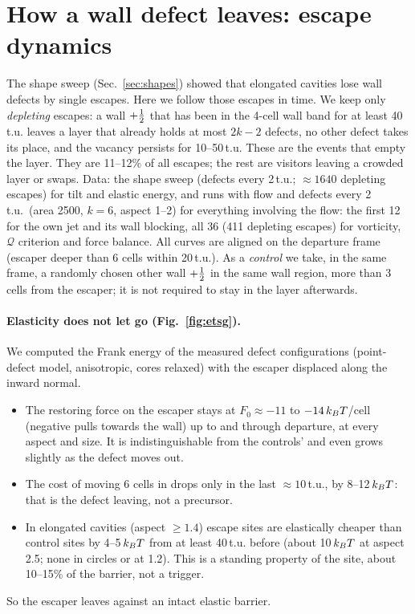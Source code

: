 \section{How a wall defect leaves: escape dynamics}\label{sec:escape}
The shape sweep (Sec.~\ref{sec:shapes}) showed that elongated cavities lose wall defects by single escapes. Here we follow those escapes in time. We keep only
\emph{depleting} escapes: a wall $+\tfrac12$ that has been in the 4-cell wall band for at least 40\,t.u. leaves a layer that already holds at most $2k-2$ defects, no other
defect takes its place, and the vacancy persists for 10--50\,t.u. These are the events that empty the layer. They are 11--12\% of all escapes; the rest are visitors
leaving a crowded layer or swaps. Data: the shape sweep (defects every 2\,t.u.; $\approx1640$ depleting escapes) for tilt and elastic energy, and runs with flow and defects
every 2\,t.u.\ (area 2500, $k=6$, aspect 1--2) for everything involving the flow: the first 12 for the own jet and its wall blocking, all 36 (411 depleting escapes) for vorticity,
$\mathcal Q$ criterion and force balance. All curves are aligned on the departure frame (escaper deeper than 6 cells within 20\,t.u.). As a \emph{control} we take, in the same frame, a randomly chosen other wall $+\tfrac12$ in the same wall region, more than 3 cells from the escaper; it is not required to stay in the layer afterwards.

\paragraph{Elasticity does not let go (Fig.~\ref{fig:etsg}).} We computed the Frank energy of the measured defect configurations (point-defect model, anisotropic, cores relaxed)
with the escaper displaced along the inward normal.
\begin{itemize}
  \item The restoring force on the escaper stays at $F_0\approx-11$ to $-14\,k_BT$/cell (negative pulls towards the wall) up to and through departure, at every aspect and size. It is
        indistinguishable from the controls' and even grows slightly as the defect moves out.
  \item The cost of moving 6 cells in drops only in the last $\approx10$\,t.u., by 8--12\,$k_BT$: that is the defect leaving, not a precursor.
  \item In elongated cavities (aspect $\ge1.4$) escape sites are elastically cheaper than control sites by 4--5\,$k_BT$ from at least 40\,t.u. before (about 10\,$k_BT$ at aspect 2.5; none in circles
        or at 1.2). This is a standing property of the site, about 10--15\% of the barrier, not a trigger.
\end{itemize}
So the escaper leaves against an intact elastic barrier.

